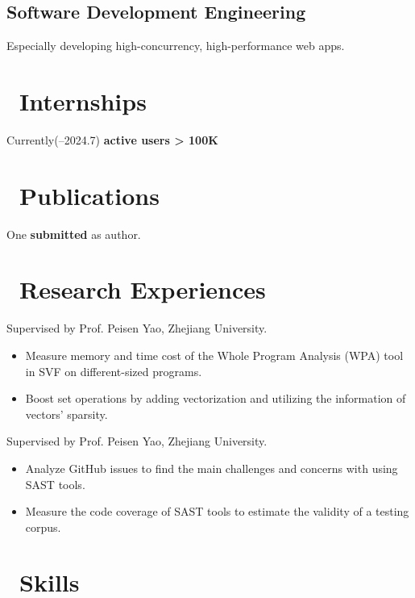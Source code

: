 \documentclass{resume}
\begin{document}
\subsection{Software Development Engineering}
Especially developing high-concurrency, high-performance web apps.

\section{\faUsers\ Internships}
Currently(--2024.7) \textbf{active users > 100K}

\section{\faBookmarkO\ Publications}
One \textbf{submitted} as  author.

\section{\faSearch\ Research Experiences}
Supervised by Prof. Peisen Yao, Zhejiang University.
\begin{itemize}
  \item Measure memory and time cost of the Whole Program Analysis (WPA) tool in SVF on different-sized programs.
  \item Boost set operations by adding vectorization and utilizing the information of vectors' sparsity.
\end{itemize}

Supervised by Prof. Peisen Yao, Zhejiang University.
\begin{itemize}
  \item Analyze GitHub issues to find the main challenges and concerns with using SAST tools.
  \item Measure the code coverage of SAST tools to estimate the validity of a testing corpus.
\end{itemize}

\section{\faCogs\ Skills}
\end{document}

